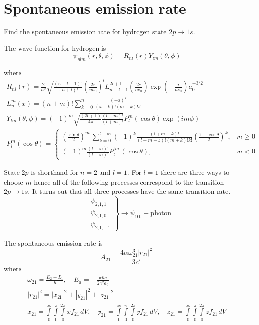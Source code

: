 

\section*{Spontaneous emission rate}

Find the spontaneous emission rate for hydrogen state $2p\rightarrow1s$.

\bigskip
The wave function for hydrogen is
\begin{equation*}
\psi_{nlm}(r,\theta,\phi)=R_{nl}(r)Y_{lm}(\theta,\phi)
\end{equation*}

where
\begin{gather*}
R_{nl}(r)=
\frac{2}{n^2}
\sqrt{\frac{(n-l-1)!}{(n+l)!}}
\left(\frac{2r}{na_0}\right)^l
L_{n-l-1}^{2l+1}\left(\frac{2r}{na_0}\right)
\exp\left(-\frac{r}{na_0}\right)
a_0^{-3/2}
\\[1ex]
L_n^m(x)=(n+m)!\sum_{k=0}^n\frac{(-x)^k}{(n-k)!(m+k)!k!}
\\[1ex]
Y_{lm}(\theta,\phi)=(-1)^m
\sqrt{\frac{(2l+1)}{4\pi}
\frac{(l-m)!}{(l+m)!}}
P_l^m(\cos\theta)\exp(im\phi)
\\[1ex]
P_l^m(\cos\theta)=\begin{cases}
\displaystyle
\left(\frac{\sin\theta}{2}\right)^m\,\sum_{k=0}^{l-m}
(-1)^k\frac{(l+m+k)!}{(l-m-k)!(m+k)!k!}
\left(\frac{1-\cos\theta}{2}\right)^k, & m\ge0
\\[3ex]
\displaystyle
(-1)^m\frac{(l+m)!}{(l-m)!}P_l^{|m|}(\cos\theta), & m<0
\end{cases}
\end{gather*}

State $2p$ is shorthand for $n=2$ and $l=1$.
For $l=1$ there are three ways to choose $m$ hence all of the following processes correspond to the transition
$2p\rightarrow1s$.
It turns out that all three processes have the same transition rate.
\begin{equation*}
\left.\begin{aligned}
&\psi_{2,1,1}
\\
&\psi_{2,1,0}
\\
&\psi_{2,1,-1}
\end{aligned}\right\}\rightarrow\psi_{100}+\text{photon}
\end{equation*}

The spontaneous emission rate is
\begin{equation*}
A_{21}=\frac{4\alpha\omega_{21}^3|r_{21}|^2}{3c^2}
\tag{1}
\end{equation*}
where
\begin{gather*}
\omega_{21}=\frac{E_2-E_1}{\hbar},\quad E_n=-\frac{\alpha\hbar c}{2n^2a_0}
\\[1ex]
|r_{21}|^2=|x_{21}|^2+|y_{21}|^2+|z_{21}|^2
\\[1ex]
x_{21}=\int\limits_{0}^{\infty}\int\limits_{0}^{\pi}\int\limits_{0}^{2\pi}xf_{21}\,dV,
\quad
y_{21}=\int\limits_{0}^{\infty}\int\limits_{0}^{\pi}\int\limits_{0}^{2\pi}yf_{21}\,dV,
\quad
z_{21}=\int\limits_{0}^{\infty}\int\limits_{0}^{\pi}\int\limits_{0}^{2\pi}zf_{21}\,dV
\end{gather*}

